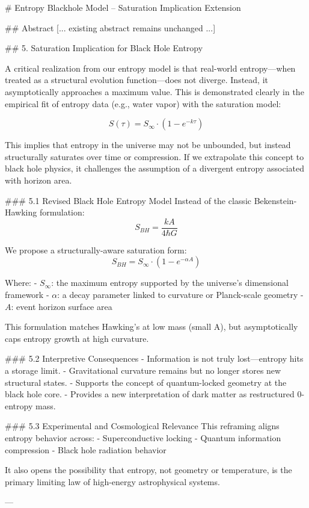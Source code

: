 # Entropy Blackhole Model – Saturation Implication Extension

## Abstract
[... existing abstract remains unchanged ...]

## 5. Saturation Implication for Black Hole Entropy

A critical realization from our entropy model is that real-world entropy—when treated as a structural evolution function—does not diverge. Instead, it asymptotically approaches a maximum value. This is demonstrated clearly in the empirical fit of entropy data (e.g., water vapor) with the saturation model:

\[
S(\tau) = S_{\infty} \cdot \left(1 - e^{-k \tau} \right)
\]

This implies that entropy in the universe may not be unbounded, but instead structurally saturates over time or compression. If we extrapolate this concept to black hole physics, it challenges the assumption of a divergent entropy associated with horizon area.

### 5.1 Revised Black Hole Entropy Model
Instead of the classic Bekenstein-Hawking formulation:
\[
S_{BH} = \frac{k A}{4 \hbar G}
\]

We propose a structurally-aware saturation form:
\[
S_{BH} = S_{\infty} \cdot \left(1 - e^{-\alpha A} \right)
\]

Where:
- \( S_{\infty} \): the maximum entropy supported by the universe’s dimensional framework
- \( \alpha \): a decay parameter linked to curvature or Planck-scale geometry
- \( A \): event horizon surface area

This formulation matches Hawking’s at low mass (small A), but asymptotically caps entropy growth at high curvature.

### 5.2 Interpretive Consequences
- Information is not truly lost—entropy hits a storage limit.
- Gravitational curvature remains but no longer stores new structural states.
- Supports the concept of quantum-locked geometry at the black hole core.
- Provides a new interpretation of dark matter as restructured 0-entropy mass.

### 5.3 Experimental and Cosmological Relevance
This reframing aligns entropy behavior across:
- Superconductive locking
- Quantum information compression
- Black hole radiation behavior

It also opens the possibility that entropy, not geometry or temperature, is the primary limiting law of high-energy astrophysical systems.

---


